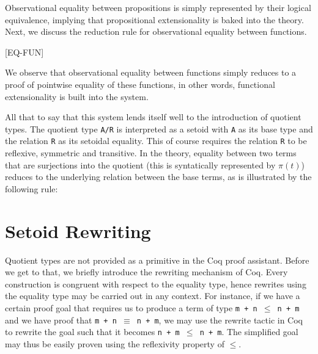 \documentclass[12pt,twoside,maitrise]{dms}
\theoremstyle{definition}
\numberwithin{equation}{section}
\numberwithin{table}{chapter}
\numberwithin{figure}{chapter}
\newcommand\kw[1] {\textsf{#1}}
\newcommand\id[1] {\texttt{#1}}
\newcommand\fn[1] {\texttt{#1}}
\begin{document}
Observational equality between propositions is simply represented by their
logical equivalence, implying that propositional extensionality is baked into
the theory. Next, we discuss the reduction rule for observational equality
between functions.

\begin{prooftree*}

  [\kw{EQ-FUN}]{}
\end{prooftree*}

We observe that observational equality between functions simply reduces to a
proof of pointwise equality of these functions, in other words, functional
extensionality is built into the system.

All that to say that this system lends itself well to the introduction of
quotient types. The quotient type \fn{A/R} is interpreted as a setoid with
\id{A} as its base type and the relation \id{R} as its setoidal equality. This
of course requires the relation \id{R} to be reflexive, symmetric and
transitive. In the theory, equality between two terms that are surjections into
the quotient (this is syntatically represented by $\pi(t)$) reduces to the
underlying relation between the base terms, as is illustrated by the following
rule:

\begin{prooftree*}

\end{prooftree*}


\section{Setoid Rewriting}

Quotient types are not provided as a primitive in the Coq proof assistant.
Before we get to that, we briefly introduce the rewriting mechanism of Coq.
Every construction is congruent with respect to the equality type, hence
rewrites using the equality type may be carried out in any context. For
instance, if we have a certain proof goal that requires us to produce a term of
type \fn{m + n $\le$ n + m} and we have proof that \fn{m + n $\equiv$ n + m}, we
may use the \kw{rewrite} tactic in Coq to rewrite the goal such that it becomes
\fn{n + m $\le$ n + m}. The simplified goal may thus be easily proven using the
reflexivity property of $\le$.
\end{document}
